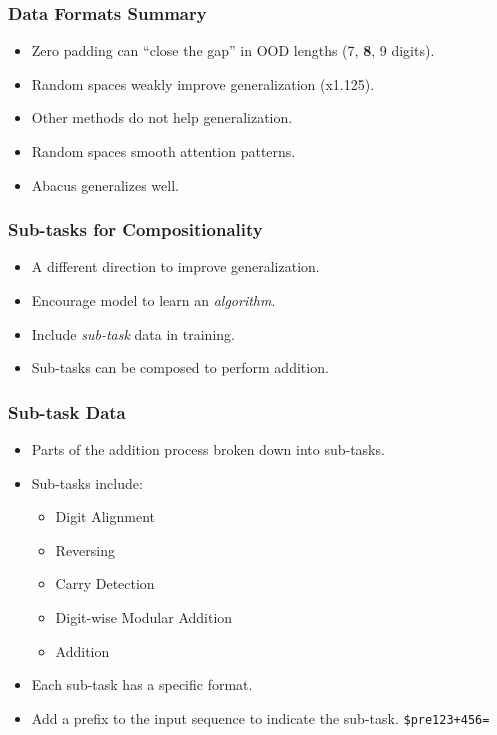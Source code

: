 \documentclass[14pt,aspectratio=169]{beamer}
\theoremstyle{remark}
\begin{document}
\begin{frame}
    \frametitle{Data Formats Summary}
    \begin{itemize}
        \item Zero padding can ``close the gap'' in OOD lengths (7, \textbf{8}, 9 digits).
        \item Random spaces weakly improve generalization (x1.125).
        \item Other methods do not help generalization.
        \item Random spaces smooth attention patterns.
        \item Abacus generalizes well.
    \end{itemize}
\end{frame}

\begin{frame}
    \frametitle{Sub-tasks for Compositionality}
    \begin{itemize}
        \item A different direction to improve generalization.
        \item Encourage model to learn an \emph{algorithm}.
        \item Include \emph{sub-task} data in training.
        \item Sub-tasks can be composed to perform addition.
    \end{itemize}
\end{frame}

\begin{frame}
    \frametitle{Sub-task Data}
    \begin{itemize}
        \item Parts of the addition process broken down into sub-tasks.
        \item Sub-tasks include:
              \begin{itemize}
                  \item Digit Alignment
                  \item Reversing
                  \item Carry Detection
                  \item Digit-wise Modular Addition
                  \item Addition
              \end{itemize}
        \item Each sub-task has a specific format.
        \item Add a prefix to the input sequence to indicate the sub-task.
              \texttt{\$pre123+456=}
    \end{itemize}
\end{frame}
\end{document}
